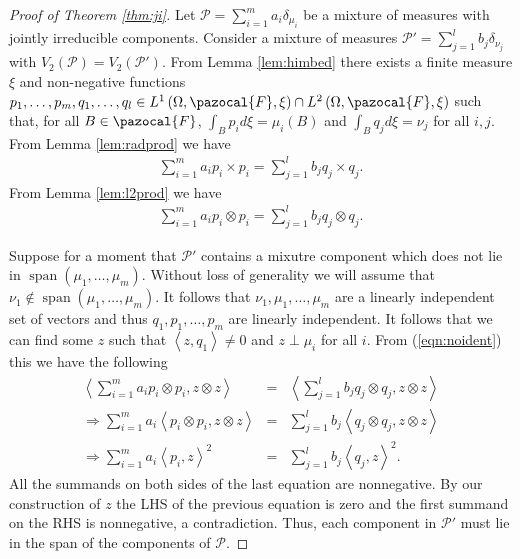 \documentclass[aos]{imsart}
\def\l{\left}
\def\r{\right}
\def\sF{\pazocal{F}}
\def\sP{\mathscr{P}}
\def\span{\operatorname{span}}
\def\span{\operatorname{span}}
\theoremstyle{plain}
\theoremstyle{defintion}
\begin{document}
	\begin{proof}[Proof of Theorem \ref{thm:ji}]
		Let $\sP = \sum_{i=1}^m a_i \delta_{\mu_i}$ be a mixture of measures with jointly irreducible components. Consider a mixture of measures $\sP' = \sum_{j=1}^l b_j\delta_{\nu_j}$ with $V_2(\sP)= V_2(\sP')$. From Lemma \ref{lem:himbed} there exists a finite measure $\xi$ and non-negative functions $p_1,\ldots,p_m,q_1,\ldots,q_l \in L^1\left( \Omega, \sF, \xi \right)\cap L^2\left( \Omega, \sF, \xi \right)$ such that, for all $B\in \sF$, $\int_B p_i d\xi = \mu_i(B)$ and $\int_B q_j d\xi = \nu_j$ for all $i,j$. From Lemma \ref{lem:radprod} we have
		\begin{eqnarray*}
			\sum_{i=1}^m  a_i p_i \times p_i = \sum_{j=1}^l  b_j q_j\times q_j.
		\end{eqnarray*}
		From Lemma \ref{lem:l2prod} we have
		\begin{eqnarray}
			\label{eqn:noident}
			\sum_{i=1}^m  a_i p_i \otimes p_i = \sum_{j=1}^l  b_j q_j\otimes q_j.
		\end{eqnarray}

		Suppose for a moment that $\sP'$ contains a mixutre component which does not lie in $\span\left( \mu_1,\ldots,\mu_m \right)$. Without loss of generality we will assume that $\nu_1 \notin \span\left( \mu_1,\ldots,\mu_m \right)$. It follows that $\nu_1,\mu_1,\ldots,\mu_m$ are a linearly independent set of vectors and thus $q_1,p_1,\ldots,p_m$ are linearly independent. It follows that we can find some $z$ such that $\l<z,q_1\r> \neq 0$ and $z\perp \mu_i$ for all $i$. From (\ref{eqn:noident}) this we have the following
		\begin{eqnarray*}
			\l<\sum_{i=1}^m  a_i p_i \otimes p_i,z\otimes z\r> &=& \l<\sum_{j=1}^l  b_j q_j\otimes q_j,z\otimes z\r>\\
			\Rightarrow \sum_{i=1}^m a_i\l<   p_i \otimes p_i,z\otimes z\r> &=& \sum_{j=1}^l b_j\l<   q_j\otimes q_j,z\otimes z\r>\\
			\Rightarrow \sum_{i=1}^m a_i\l<   p_i ,z\r>^2 &=& \sum_{j=1}^l b_j\l<   q_j,z\r>^2.
		\end{eqnarray*}
		All the summands on both sides of the last equation are nonnegative. By our construction of $z$ the LHS of the previous equation is zero and the first summand on the RHS is nonnegative, a contradiction. Thus, each component in $\sP'$ must lie in the span of the components of $\sP$.
		

\end{proof}
\end{document}
